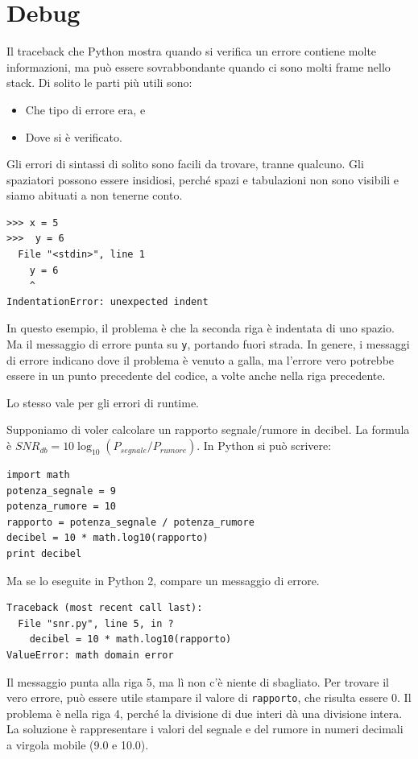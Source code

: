 \documentclass[10pt]{book}
\begin{document}
\section{Debug}
\label{whitespace}

Il traceback che Python mostra quando si verifica un errore contiene molte informazioni, ma può essere sovrabbondante quando ci sono molti frame nello stack. Di solito le parti più utili sono:

\begin{itemize}

\item Che tipo di errore era, e

\item Dove si è verificato.

\end{itemize}

Gli errori di sintassi di solito sono facili da trovare, tranne qualcuno. Gli spaziatori possono essere insidiosi, perché spazi e tabulazioni non sono visibili e siamo abituati a non tenerne conto.

\begin{verbatim}
>>> x = 5
>>>  y = 6
  File "<stdin>", line 1
    y = 6
    ^
IndentationError: unexpected indent
\end{verbatim}
%
In questo esempio, il problema è che la seconda riga è indentata di uno spazio. Ma il messaggio di errore punta su {\tt y}, portando fuori strada. In genere, i messaggi di errore indicano dove il problema è venuto a galla, ma l'errore vero potrebbe essere in un punto precedente del codice, a volte anche nella riga precedente.


Lo stesso vale per gli errori di runtime. 

Supponiamo di voler calcolare un rapporto segnale/rumore in decibel. La formula è
 $SNR_{db} = 10 \log_{10} (P_{segnale} / P_{rumore})$. In Python si può scrivere:

\begin{verbatim}
import math
potenza_segnale = 9
potenza_rumore = 10
rapporto = potenza_segnale / potenza_rumore
decibel = 10 * math.log10(rapporto)
print decibel
\end{verbatim}
%
Ma se lo eseguite in Python 2, compare un messaggio di errore.

\begin{verbatim}
Traceback (most recent call last):
  File "snr.py", line 5, in ?
    decibel = 10 * math.log10(rapporto)
ValueError: math domain error
\end{verbatim}
%
Il messaggio punta alla riga 5, ma lì non c'è niente di sbagliato. Per trovare il vero errore, può essere utile stampare il valore di {\tt rapporto}, che risulta essere 0. Il problema è nella riga 4, perché la divisione di due interi dà una divisione intera. La soluzione è rappresentare i valori del segnale e del rumore in numeri decimali a virgola mobile (9.0 e 10.0).
\end{document}
